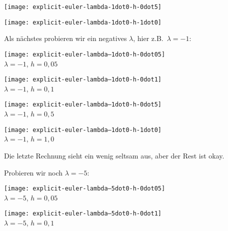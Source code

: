\begin{center}
	\begin{minipage}{0.49\textwidth}
		\centering
		\texttt{[image: explicit-euler-lambda-1dot0-h-0dot5]}
	\end{minipage}
	\begin{minipage}{0.49\textwidth}
		\begin{center}
		\texttt{[image: explicit-euler-lambda-1dot0-h-1dot0]}
		\end{center}
	\end{minipage}
\end{center}


Als nächstes probieren wir ein negatives $\lambda$, hier z.B.\ $\lambda=-1$:

\begin{center}
\begin{minipage}{0.49\textwidth}
	\centering
	\texttt{[image: explicit-euler-lambda--1dot0-h-0dot05]} \\
	$\lambda=-1$, $h = 0{,}05$
\end{minipage}
\begin{minipage}{0.49\textwidth}
	\centering
	\texttt{[image: explicit-euler-lambda--1dot0-h-0dot1]} \\
	$\lambda=-1$, $h = 0{,}1$
\end{minipage}
\end{center}

\begin{center}
	\begin{minipage}{0.49\textwidth}
		\centering
		\texttt{[image: explicit-euler-lambda--1dot0-h-0dot5]} \\
		$\lambda=-1$, $h = 0{,}5$
	\end{minipage}
	\begin{minipage}{0.49\textwidth}
		\centering
		\texttt{[image: explicit-euler-lambda--1dot0-h-1dot0]} \\
		$\lambda=-1$, $h = 1{,}0$
	\end{minipage}
\end{center}

\bigskip

Die letzte Rechnung sieht ein wenig seltsam aus, aber der Rest ist okay.

Probieren wir noch $\lambda = -5$:

\begin{center}
	\begin{minipage}{0.49\textwidth}
		\centering
		\texttt{[image: explicit-euler-lambda--5dot0-h-0dot05]} \\
		$\lambda=-5$, $h = 0{,}05$
	\end{minipage}
	\begin{minipage}{0.49\textwidth}
		\centering
		\texttt{[image: explicit-euler-lambda--5dot0-h-0dot1]} \\
		$\lambda=-5$, $h = 0{,}1$
	\end{minipage}
\end{center}

